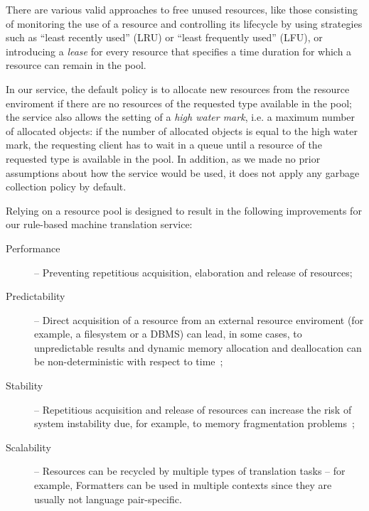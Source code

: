 \documentclass[11pt]{article}
\begin{document}
There are various valid approaches to free unused resources, like those consisting of monitoring 
the use of a resource and controlling its lifecycle by using  strategies such as ``least 
recently used'' (LRU) or ``least frequently used'' (LFU), or introducing a \emph{lease} for 
every resource that specifies a time duration for which a resource can remain in the pool.

In our service, the default policy is to allocate new resources from the resource enviroment if 
there are no resources of the requested type available in the pool; the service also allows the 
setting of a \emph{high water mark}, i.e. a maximum number of allocated objects: if the number of 
allocated objects is equal to the high water mark, the requesting client has to wait in a queue until 
a resource of the requested type is available in the pool. In addition, as we made no prior 
assumptions about how the service would be used, it does not apply any garbage collection policy by default.

Relying on a resource pool is designed to result in the following improvements for our rule-based machine translation service:

\begin{description}
 \item[Performance] -- Preventing repetitious acquisition, elaboration and release of resources;
 \item[Predictability] -- Direct acquisition of a resource from an external resource enviroment (for example, a filesystem or a DBMS) can lead, in some cases, to unpredictable results and dynamic memory allocation and deallocation can be non-deterministic with respect to time~\citep{realtime};
 \item[Stability] -- Repetitious acquisition and release of resources can increase the risk of system instability due, for example, to memory fragmentation problems~\citep{robust, realtime};  %



 \item[Scalability] -- Resources can be recycled by multiple types of translation tasks -- for example, Formatters can be used in multiple contexts since they are usually not language pair-specific.
\end{description}
\end{document}
